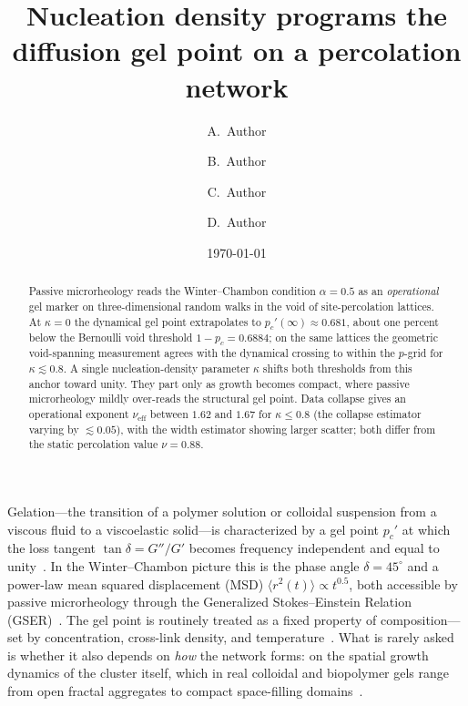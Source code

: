 \documentclass[aps,prl,twocolumn,superscriptaddress,floatfix,nofootinbib,longbibliography]{revtex4-2}
\newcommand{\msd}{\langle r^2(t)\rangle}
\newcommand{\pc}{p_c}
\newcommand{\pcp}{p_c'}
\newcommand{\kap}{\kappa}
\newcommand{\nueff}{\nu_{\mathrm{eff}}}
\begin{document}
\title{Nucleation density programs the diffusion gel point on a percolation network}

\author{A.~Author}
\author{B.~Author}
\author{C.~Author}
\author{D.~Author}
\affiliation{[Affiliation], [Institution], [City], [Country]}

\date{\today}

\begin{abstract}
Passive microrheology reads the Winter--Chambon condition $\alpha=0.5$ as an \emph{operational} gel marker on three-dimensional random walks in the void of site-percolation lattices. At $\kap=0$ the dynamical gel point extrapolates to $\pcp(\infty)\approx0.681$, about one percent below the Bernoulli void threshold $1-\pc=0.6884$; on the same lattices the geometric void-spanning measurement agrees with the dynamical crossing to within the $p$-grid for $\kap\lesssim0.8$. A single nucleation-density parameter $\kap$ shifts both thresholds from this anchor toward unity. They part only as growth becomes compact, where passive microrheology mildly over-reads the structural gel point. Data collapse gives an operational exponent $\nueff$ between $1.62$ and $1.67$ for $\kap\le0.8$ (the collapse estimator varying by $\lesssim0.05$), with the width estimator showing larger scatter; both differ from the static percolation value $\nu=0.88$.
\end{abstract}

\maketitle

Gelation---the transition of a polymer solution or colloidal suspension from a viscous fluid to a viscoelastic solid---is characterized by a gel point $\pcp$ at which the loss tangent $\tan\delta = G''/G'$ becomes frequency independent and equal to unity~\cite{Chambon1987,Winter1987}. In the Winter--Chambon picture this is the phase angle $\delta=45^{\circ}$ and a power-law mean squared displacement (MSD) $\msd\propto t^{0.5}$, both accessible by passive microrheology through the Generalized Stokes--Einstein Relation (GSER)~\cite{Mason1995,Mason2000,Squires2010fluid}. The gel point is routinely treated as a fixed property of composition---set by concentration, cross-link density, and temperature~\cite{Rubinstein2003,Larson1999}. What is rarely asked is whether it also depends on \emph{how} the network forms: on the spatial growth dynamics of the cluster itself, which in real colloidal and biopolymer gels range from open fractal aggregates to compact space-filling domains~\cite{Trappe2001,Coniglio2004,Ng2008}.
\end{document}

